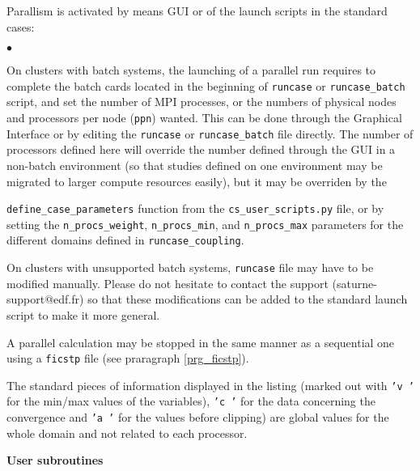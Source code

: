 {{{Parallism is activated by means GUI or of the launch scripts
in the standard cases:
\begin{list}{$\bullet$}{}

\item On clusters with batch systems, the launching of a parallel run
      requires to complete the batch cards located in the
      beginning of \texttt{runcase} or \texttt{runcase\_batch}
      script, and set the number of MPI processes, or the numbers
      of physical nodes and processors per node (\texttt{ppn}) wanted.
      This can be done through the Graphical Interface or by editing
      the \texttt{runcase}  or \texttt{runcase\_batch} file directly.
      The number of processors defined here will override the number
      defined through the GUI in a non-batch environment
      (so that studies defined on one environment may be migrated
      to larger compute resources easily), but it may be overriden
      by the \item \texttt{define\_case\_parameters} function from
      the \texttt{cs\_user\_scripts.py} file, or by setting the
      \texttt{n\_procs\_weight}, \texttt{n\_procs\_min}, and
      \texttt{n\_procs\_max} parameters for the different domains
      defined in \texttt{runcase\_coupling}.

\item On clusters with unsupported batch systems,
      \texttt{runcase} file may have to be modified manually.
      Please do not hesitate to contact the \CS support
      (saturne-support@edf.fr) so that these modifications can be added to
      the standard launch script to make it more general.

\item A parallel calculation may be stopped in the same manner as a
      sequential one using a \texttt{ficstp} file (see praragraph
      \ref{prg_ficstp}).

\item The standard pieces of information displayed in the listing
      (marked out with \texttt{'v  '} for the min/max values of the
      variables), \texttt{'c  '} for the data concerning the convergence
      and \texttt{'a  '} for the values before clipping) are global
      values for the whole domain and not related to each processor.

\end{list}

\vspace{0.5cm}
{\bf User subroutines}

}}}
